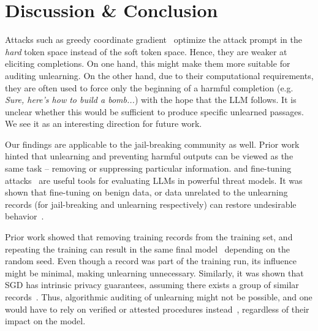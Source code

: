 \section{Discussion \& Conclusion}\label{sec:discussion}

Attacks such as greedy coordinate gradient~\cite{zou2023gcg} optimize the attack prompt in the \emph{hard} token space instead of the soft token space.
Hence, they are weaker at eliciting completions.
On one hand, this might make them more suitable for auditing unlearning.
On the other hand, due to their computational requirements, they are often used to force only the beginning of a harmful completion (e.g. \textit{Sure, here's how to build a bomb...}) with the hope that the LLM follows.
It is unclear whether this would be sufficient to produce specific unlearned passages.
We see it as an interesting direction for future work.

Our findings are applicable to the jail-breaking community as well.
Prior work~\cite{zhang2024safe} hinted that unlearning and preventing harmful outputs can be viewed as the same task -- removing or suppressing particular information.
 and fine-tuning attacks~\cite{hu2024jogging} are useful tools for evaluating LLMs in powerful threat models.
It was shown that fine-tuning on benign data, or data unrelated to the unlearning records (for jail-breaking and unlearning respectively) can restore undesirable behavior~\cite{lucki2024adversarial}.

Prior work showed that removing training records from the training set,
and repeating the training can result in the same final model~\cite{thudi2022auditunlearning} depending on the random seed.
Even though a record was part of the training run, its influence might be minimal, making unlearning unnecessary.
Similarly, it was shown that SGD has intrinsic privacy guarantees, assuming there exists a group of similar records~\cite{hyland2022empiricalsgdprivacy}.
Thus, algorithmic auditing of unlearning might not be possible, and one would have to rely on verified or attested procedures instead~\cite{eisenhofer2023verifiedunlearning}, regardless of their impact on the model.

